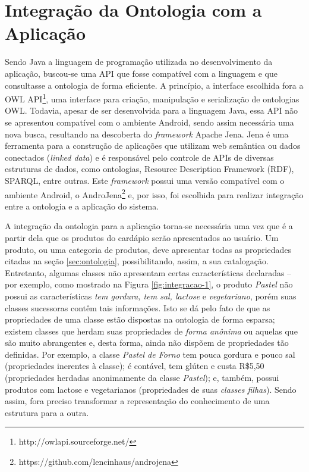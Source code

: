 \section{Integração da Ontologia com a Aplicação}

Sendo Java a linguagem de programação utilizada no desenvolvimento da aplicação, buscou-se uma API que fosse compatível com a linguagem e que consultasse a ontologia de forma eficiente. A princípio, a interface escolhida fora a OWL API\footnote{http://owlapi.sourceforge.net/}, uma interface para criação, manipulação e serialização de ontologias OWL. Todavia, apesar de ser desenvolvida para a linguagem Java, essa API não se apresentou compatível com o ambiente Android, sendo assim necessária uma nova busca, resultando na descoberta do \emph{framework} Apache Jena. Jena é uma ferramenta para a construção de aplicações que utilizam web semântica ou dados conectados (\emph{linked data}) e é responsável pelo controle de APIs de diversas estruturas de dados, como ontologias, Resource Description Framework (RDF), SPARQL, entre outras. Este \emph{framework} possui uma versão compatível com o ambiente Android, o AndroJena\footnote{https://github.com/lencinhaus/androjena} e, por isso, foi escolhida para realizar integração entre a ontologia e a aplicação do sistema.

A integração da ontologia para a aplicação torna-se necessária uma vez que é a partir dela que os produtos do cardápio serão apresentados ao usuário. Um produto, ou uma categoria de produtos, deve apresentar todas as propriedades citadas na seção \ref{sec:ontologia}, possibilitando, assim, a sua catalogação. Entretanto, algumas classes não apresentam certas características declaradas -- por exemplo, como mostrado na Figura \ref{fig:integracao-1}, o produto \emph{Pastel} não possui as características \emph{tem gordura, tem sal, lactose} e \emph{vegetariano}, porém suas classes sucessoras contêm tais informações. Isto se dá pelo fato de que as propriedades de uma classe estão dispostas na ontologia de forma esparsa; existem classes que herdam suas propriedades de \emph{forma anônima} ou aquelas que são muito abrangentes e, desta forma, ainda não dispõem de propriedades tão definidas. Por exemplo, a classe \emph{Pastel de Forno} tem pouca gordura e pouco sal (propriedades inerentes à classe); é contável, tem glúten e custa R\$5,50 (propriedades herdadas anonimamente da classe \emph{Pastel}); e, também, possui produtos com lactose e vegetarianos (propriedades de suas \emph{classes filhas}). Sendo assim, fora preciso transformar a representação do conhecimento de uma estrutura para a outra.

